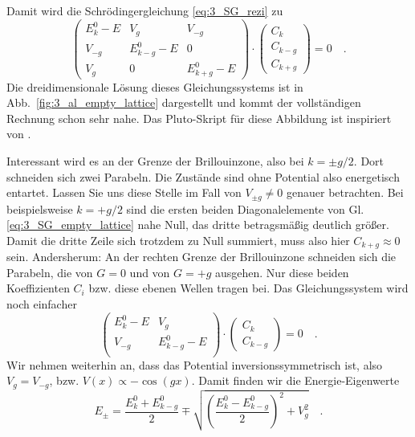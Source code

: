 Damit wird die Schrödingergleichung \ref{eq:3_SG_rezi} zu
\begin{equation}
   \begin{pmatrix}
    E_k^0 - E &  V_{g} &  V_{-g} \\
    V_{-g}  &   E_{k - g}^0 - E & 0  \\
    V_{g}  &  0 &     E_{k + g}^0 - E  
\end{pmatrix}
  \cdot
  \begin{pmatrix}
    C_{k} \\  C_{k - g} \\  C_{k + g}
  \end{pmatrix}
 = 0  \quad . 
 \label{eq:3_SG_empty_lattice} 
\end{equation}
Die dreidimensionale Lösung dieses Gleichungssystems ist in Abb.~\ref{fig:3_al_empty_lattice} dargestellt und kommt der vollständigen Rechnung schon sehr nahe. Das Pluto-Skript für diese Abbildung ist inspiriert von \cite{Polakovic_cmpm3}.

Interessant wird es an der Grenze der Brillouinzone, also bei $k = \pm g/2$. Dort schneiden sich zwei Parabeln. Die Zustände sind ohne Potential also energetisch entartet. Lassen Sie uns diese Stelle im Fall von  $V_{\pm g} \neq 0$ genauer betrachten. Bei beispielsweise $k = + g/2$  sind die ersten beiden Diagonalelemente von Gl. \ref{eq:3_SG_empty_lattice} nahe Null, das dritte betragsmäßig deutlich größer. Damit die dritte Zeile sich trotzdem zu Null summiert, muss also hier $C_{k+g} \approx 0$ sein. Andersherum: An der rechten Grenze der Brillouinzone schneiden sich die Parabeln, die von $G =0$ und von $G=+g$ ausgehen. Nur diese beiden Koeffizienten $C_{i}$ bzw. diese ebenen Wellen tragen bei. Das Gleichungssystem wird noch einfacher 
\begin{equation}
    \begin{pmatrix}
        E_k^0 - E &  V_{g}  \\
     V_{-g}  &   E_{k - g}^0 - E   \\
 \end{pmatrix}
   \cdot
   \begin{pmatrix}
     C_{k} \\  C_{k - g} 
   \end{pmatrix}
  = 0 \quad . \label{eq:3_SG_empty_lattice_2}
 \end{equation}
Wir nehmen weiterhin an, dass das Potential inversionssymmetrisch ist, also $V_g = V_{-g}$, bzw. $V(x) \propto -\cos(g x)$. Damit finden wir die Energie-Eigenwerte
\begin{equation}
    E_\pm = \frac{ E_k^0 +   E_{k-g}^0}{2} \mp \sqrt{  \left( \frac{ E_k^0 -   E_{k-g}^0}{2} \right)^2 + V_g^2 }  \quad .
\end{equation}

